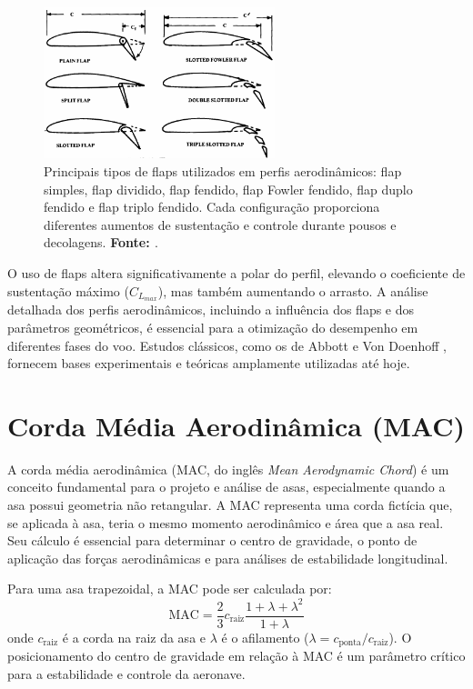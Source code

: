 \begin{figure}[H]
    \centering
    \includegraphics[width=0.6\textwidth]{figures/perfil_flap.png}
    \caption{Principais tipos de flaps utilizados em perfis aerodinâmicos: flap simples, flap dividido, flap fendido, flap Fowler fendido, flap duplo fendido e flap triplo fendido. Cada configuração proporciona diferentes aumentos de sustentação e controle durante pousos e decolagens. \textbf{Fonte: \cite{raymer2018aircraft}}.}
    \label{fig:perfil_flap}
\end{figure}

O uso de flaps altera significativamente a polar do perfil, elevando o coeficiente de sustentação máximo ($C_{L_{max}}$), mas também aumentando o arrasto. A análise detalhada dos perfis aerodinâmicos, incluindo a influência dos flaps e dos parâmetros geométricos, é essencial para a otimização do desempenho em diferentes fases do voo. Estudos clássicos, como os de Abbott e Von Doenhoff \cite{abbott1959theory}, fornecem bases experimentais e teóricas amplamente utilizadas até hoje.

\section{Corda Média Aerodinâmica (MAC)}
A corda média aerodinâmica (MAC, do inglês \textit{Mean Aerodynamic Chord}) é um conceito fundamental para o projeto e análise de asas, especialmente quando a asa possui geometria não retangular. A MAC representa uma corda fictícia que, se aplicada à asa, teria o mesmo momento aerodinâmico e área que a asa real. Seu cálculo é essencial para determinar o centro de gravidade, o ponto de aplicação das forças aerodinâmicas e para análises de estabilidade longitudinal.

Para uma asa trapezoidal, a MAC pode ser calculada por:
\[
\text{MAC} = \frac{2}{3} c_\text{raiz} \frac{1 + \lambda + \lambda^2}{1 + \lambda}
\]
onde \(c_\text{raiz}\) é a corda na raiz da asa e \(\lambda\) é o afilamento (\(\lambda = c_\text{ponta}/c_\text{raiz}\)). O posicionamento do centro de gravidade em relação à MAC é um parâmetro crítico para a estabilidade e controle da aeronave.

